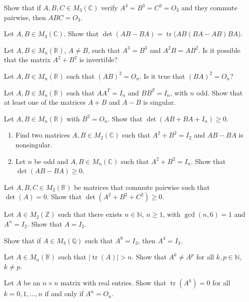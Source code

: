 \documentclass[12pt]{article}
\begin{document}
\begin{problems}
\item Show that if $A,B,C\in M_3(\mathbb{C})$ verify $A^3=B^3=C^3=O_3$ and they commute pairwise, then $ABC=O_3$.

\item Let $A,B\in M_3(\mathbb{C})$. Show that $\det(AB-BA) = \operatorname{tr}\big(AB(BA-AB)BA\big)$.

\item Let $A,B\in M_n(\mathbb{R})$, $A\ne B$, such that $A^3=B^3$ and $A^2B=AB^2$. Is it possible that the matrix $A^2+B^2$ is invertible?

\item Let $A,B\in M_n(\mathbb{R})$ such that $(AB)^2=O_n$. Is it true that $(BA)^2=O_n$?

\item Let $A,B\in M_n(\mathbb{R})$ such that $AA^T=I_n$ and $BB^T=I_n$, with $n$ odd. Show that at least one of the matrices $A+B$ and $A-B$ is singular.

\item Let $A,B\in M_n(\mathbb{R})$ with $B^2=O_n$. Show that $\det(AB+BA+I_n) \ge 0$.

\item
\begin{enumerate}[label=(\alph*)]
\item Find two matrices $A,B\in M_2(\mathbb{C})$ such that $A^2+B^2=I_2$ and $AB-BA$ is nonsingular.
\item Let $n$ be odd and $A,B\in M_n(\mathbb{C})$ such that $A^2+B^2=I_n$. Show that $\det(AB-BA)\ge 0$.
\end{enumerate}

\item Let $A,B,C\in M_2(\mathbb{R})$ be matrices that commute pairwise such that $\det(A)=0$. Show that $\det(A^2+B^2+C^2)\ge 0$.

\item Let $A\in M_2(\mathbb{Z})$ such that there exists $n\in\mathbb{N}$, $n\ge 1$, with $\gcd(n,6)=1$ and $A^n=I_2$. Show that $A=I_2$.

\item Show that if $A\in M_3(\mathbb{Q})$ such that $A^8=I_3$, then $A^4=I_3$.

\item Let $A\in M_n(\mathbb{R})$ such that $|\operatorname{tr}(A)|>n$. Show that $A^k\ne A^p$ for all $k,p\in\mathbb{N}$, $k\ne p$.

\item Let $A$ be an $n\times n$ matrix with real entries. Show that $\operatorname{tr}(A^k)=0$ for all $k=0,1,\dots,n$ if and only if $A^n=O_n$.


\end{problems}
\end{document}
